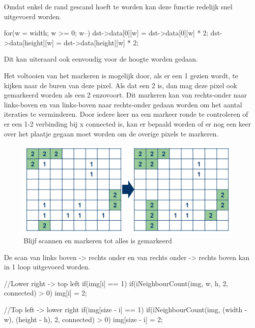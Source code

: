 Omdat enkel de rand gescand hoeft te worden kan deze functie redelijk snel
uitgevoerd worden.


\begin{cppcode}
for(w = width; w >= 0; w--){
	dst->data[0][w]      = dst->data[0][w] * 2;
	dst->data[height][w] = dst->data[height][w] * 2;
}
\end{cppcode}

Dit kan uiteraard ook eenvoudig voor de hoogte worden gedaan.

Het voltooien van het markeren is mogelijk door, als er een 1 gezien wordt,
te kijken naar de buren van deze pixel. Als dat een 2 is, dan mag deze pixel
ook gemarkeerd worden als een 2 enzovoort. Dit markeren kan van rechts-onder
naar links-boven en van links-boven naar rechts-onder gedaan worden om het
aantal iteraties te verminderen. Door iedere keer na een markeer ronde te
controleren of er een 1-2 verbinding bij x connected is, kan er bepaald worden
of er nog een keer over het plaatje gegaan moet worden om de overige pixels te
markeren.

\begin{figure}
    \begin{center}
        \includegraphics[scale=0.5]{figures/border_blob_step2.png}
    \end{center}
    \caption{Blijf scannen en markeren tot alles is gemarkeerd}
    \label{fig:bbstep2}
\end{figure}

De scan van links boven -> rechts onder en van rechts onder -> rechts boven
kan in 1 loop uitgevoerd worden.

\begin{cppcode}
//Lower right -> top left
if(img[i] == 1){
    if(iNeighbourCount(img, w, h, 2, connected) > 0){
        img[i] = 2;
    }
}

//Top left -> lower right
if(img[size - i] == 1){
    if(iNeighbourCount(img, (width - w), (height - h), 2, connected) > 0){
        img[size - i] = 2;
    }
}
\end{cppcode}

